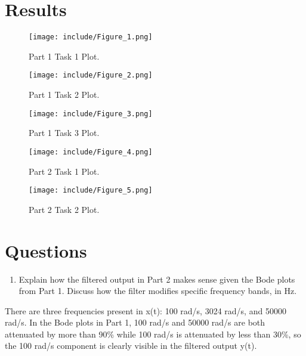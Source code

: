 \documentclass[12pt]{article}
\begin{document}
\newpage
\section*{Results}

\begin{figure}[H]
\centering
\texttt{[image: include/Figure\_1.png]}
\caption{Part 1 Task 1 Plot.}
\end{figure}

\begin{figure}[H]
\centering
\texttt{[image: include/Figure\_2.png]}
\caption{Part 1 Task 2 Plot.}
\end{figure}

\newpage
\begin{figure}[H]
\centering
\texttt{[image: include/Figure\_3.png]}
\caption{Part 1 Task 3 Plot.}
\end{figure}

\newpage
\begin{figure}[H]
\centering
\texttt{[image: include/Figure\_4.png]}
\caption{Part 2 Task 1 Plot.}
\end{figure}

\begin{figure}[H]
\centering
\texttt{[image: include/Figure\_5.png]}
\caption{Part 2 Task 2 Plot.}
\end{figure}

\newpage
\section*{Questions}

\begin{enumerate}
    \item Explain how the filtered output in Part 2 makes sense given the Bode plots from Part 1. Discuss how the filter modifies specific frequency bands, in Hz.
\end{enumerate}
    \par There are three frequencies present in x(t): 100 rad/s, 3024 rad/s, and 50000 rad/s. In the Bode plots in Part 1, 100 rad/s and 50000 rad/s are both attenuated by more than 90\% while 100 rad/s is attenuated by less than 30\%, so the 100 rad/s component is clearly visible in the filtered output y(t).
    
\end{document}
